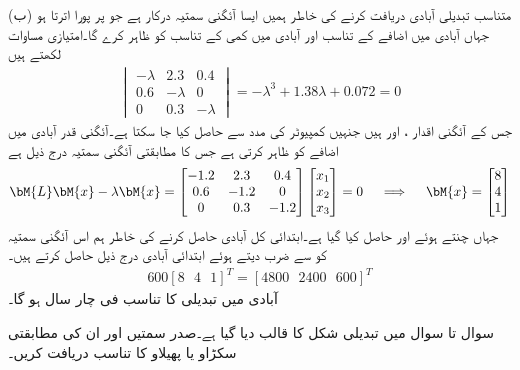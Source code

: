 (ب) متناسب تبدیلی آبادی دریافت کرنے کی خاطر ہمیں ایسا آئگنی سمتیہ  درکار ہے جو   پر پورا اترتا ہو جہاں  آبادی میں اضافے کے تناسب اور  آبادی میں کمی کے تناسب کو ظاہر کرے گا۔امتیازی مساوات لکھتے ہیں
\begin{align*}
\begin{vmatrix} -\lambda& 2.3&0.4\\0.6&-\lambda&0\\0&0.3&-\lambda \end{vmatrix}=-\lambda^3+1.38\lambda+0.072=0
\end{align*}
جس کے آئگنی اقدار ،  اور  ہیں جنہیں کمپیوٹر کی مدد سے حاصل کیا جا سکتا ہے۔آئگنی قدر  آبادی میں اضافے کو ظاہر کرتی ہے جس کا مطابقتی آئگنی سمتیہ درج ذیل ہے
\begin{align*}
\bM{L}\bM{x}-\lambda \bM{x}=\begin{bmatrix} -1.2&2.3&0.4\\0.6&-1.2&0\\0&0.3&-1.2 \end{bmatrix}\begin{bmatrix}x_1\\x_2\\x_3  \end{bmatrix}=0\quad \implies \quad \bM{x}=\begin{bmatrix} 8\\4\\1 \end{bmatrix}
\end{align*}
جہاں  چنتے ہوئے  اور  حاصل کیا گیا ہے۔ابتدائی کل آبادی  حاصل کرنے کی خاطر ہم اس آئگنی سمتیہ کو  سے ضرب دیتے ہوئے ابتدائی آبادی درج ذیل حاصل کرتے ہیں۔
\begin{align*}
600[8\,\,\,\,4\,\,\,\,1]^T=[4800\,\,\,\,2400\,\,\,\,600]^T
\end{align*}
 آبادی میں تبدیلی کا تناسب  فی  چار سال ہو گا۔

سوال  تا سوال  میں تبدیلی شکل  کا قالب  دیا گیا ہے۔صدر سمتیں اور ان کی مطابقتی سکڑاو یا پھیلاو کا تناسب دریافت کریں۔

